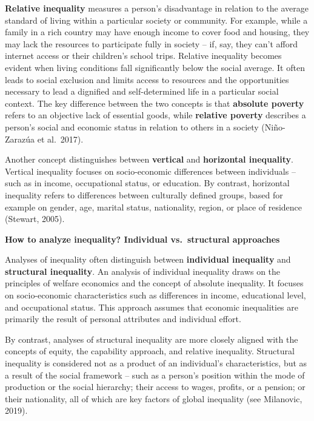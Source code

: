\documentclass[
  a4paper,
  openany]{book}
\begin{document}
\textbf{Relative inequality} measures a person's disadvantage in
relation to the average standard of living within a particular society
or community. For example, while a family in a rich country may have
enough income to cover food and housing, they may lack the resources to
participate fully in society -- if, say, they can't afford internet
access or their children's school trips. Relative inequality becomes
evident when living conditions fall significantly below the social
average. It often leads to social exclusion and limits access to
resources and the opportunities necessary to lead a dignified and
self-determined life in a particular social context. The key difference
between the two concepts is that \textbf{absolute poverty} refers to an
objective lack of essential goods, while \textbf{relative poverty}
describes a person's social and economic status in relation to others in
a society (Niño-Zarazúa et al.~2017).

Another concept distinguishes between \textbf{vertical} and
\textbf{horizontal inequality}. Vertical inequality focuses on
socio-economic differences between individuals -- such as in income,
occupational status, or education. By contrast, horizontal inequality
refers to differences between culturally defined groups, based for
example on gender, age, marital status, nationality, region, or place of
residence (Stewart, 2005).

\textbf{How to analyze inequality? Individual vs.~structural approaches}

Analyses of inequality often distinguish between \textbf{individual
inequality} and \textbf{structural inequality}. An analysis of
individual inequality draws on the principles of welfare economics and
the concept of absolute inequality. It focuses on socio-economic
characteristics such as differences in income, educational level, and
occupational status. This approach assumes that economic inequalities
are primarily the result of personal attributes and individual effort.

By contrast, analyses of structural inequality are more closely aligned
with the concepts of equity, the capability approach, and relative
inequality. Structural inequality is considered not as a product of an
individual's characteristics, but as a result of the social framework --
such as a person's position within the mode of production or the social
hierarchy; their access to wages, profits, or a pension; or their
nationality, all of which are key factors of global inequality (see
Milanovic, 2019).
\end{document}
